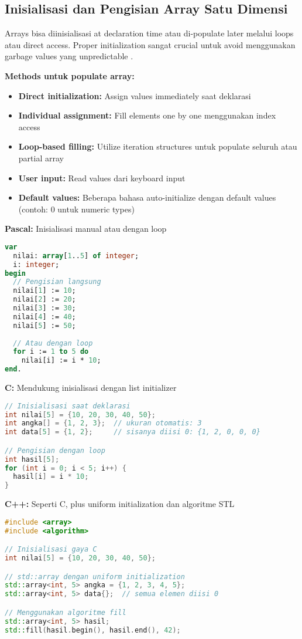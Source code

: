 \documentclass[../main.tex]{subfiles}
\begin{document}
\subsection{Inisialisasi dan Pengisian Array Satu Dimensi}
Arrays bisa diinisialisasi at declaration time atau di-populate later melalui loops atau direct access. Proper initialization sangat crucial untuk avoid menggunakan garbage values yang unpredictable \parencite{geeksforgeeks-array-init,learncpp-arrays,tambahpinter-array}.

\textbf{Methods untuk populate array:}
\begin{itemize}
  \item \textbf{Direct initialization:} Assign values immediately saat deklarasi
  \item \textbf{Individual assignment:} Fill elements one by one menggunakan index access
  \item \textbf{Loop-based filling:} Utilize iteration structures untuk populate seluruh atau partial array
  \item \textbf{User input:} Read values dari keyboard input
  \item \textbf{Default values:} Beberapa bahasa auto-initialize dengan default values (contoh: 0 untuk numeric types)
\end{itemize}

\textbf{Pascal:} Inisialisasi manual atau dengan loop
\begin{lstlisting}[language=Pascal, caption={Inisialisasi array di Pascal}]
var
  nilai: array[1..5] of integer;
  i: integer;
begin
  // Pengisian langsung
  nilai[1] := 10;
  nilai[2] := 20;
  nilai[3] := 30;
  nilai[4] := 40;
  nilai[5] := 50;
  
  // Atau dengan loop
  for i := 1 to 5 do
    nilai[i] := i * 10;
end.
\end{lstlisting}

\textbf{C:} Mendukung inisialisasi dengan list initializer
\begin{lstlisting}[language=C, caption={Inisialisasi array di C}]
// Inisialisasi saat deklarasi
int nilai[5] = {10, 20, 30, 40, 50};
int angka[] = {1, 2, 3};  // ukuran otomatis: 3
int data[5] = {1, 2};     // sisanya diisi 0: {1, 2, 0, 0, 0}

// Pengisian dengan loop
int hasil[5];
for (int i = 0; i < 5; i++) {
  hasil[i] = i * 10;
}
\end{lstlisting}

\textbf{C++:} Seperti C, plus uniform initialization dan algoritme STL
\begin{lstlisting}[language=C++, caption={Inisialisasi array di C++}]
#include <array>
#include <algorithm>

// Inisialisasi gaya C
int nilai[5] = {10, 20, 30, 40, 50};

// std::array dengan uniform initialization
std::array<int, 5> angka = {1, 2, 3, 4, 5};
std::array<int, 5> data{};  // semua elemen diisi 0

// Menggunakan algoritme fill
std::array<int, 5> hasil;
std::fill(hasil.begin(), hasil.end(), 42);
\end{lstlisting}
\end{document}
